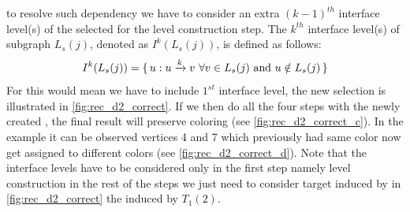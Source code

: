    \Inorder to resolve such dependency we have to consider an extra $(k-1)^{th}$ interface level(s) of the selected \subgraph for the level construction step. The $k^{th}$ interface level(s) of subgraph $L_s(j)$, denoted as $I^k(L_s(j))$, is defined as follows:
   \begin{equation*}
	   I^k(L_s(j)) = \set{u : u \xrightarrow{k} v \text{  } \forall v \in L_s(j) \text { and } u \notin L_s(j)}
   \end{equation*}
   For \DTWO this would mean we have to include $1^{st}$ interface level, the new selection is illustrated in \cref{fig:rec_d2_correct}. If we then do all the four steps with the newly created \subgraph, the final result will preserve \DTWO coloring (see \cref{fig:rec_d2_correct_c}). In the example it can be observed vertices 4 and 7 which previously had same color now get assigned to different colors (see \cref{fig:rec_d2_correct_d}). Note that the interface levels have to be considered only in the first step namely level construction in the rest of the steps we just need to consider target \subgraphs induced by \levelGroups \ie in \cref{fig:rec_d2_correct} the \subgraph induced by $T_1(2)$. 
   
